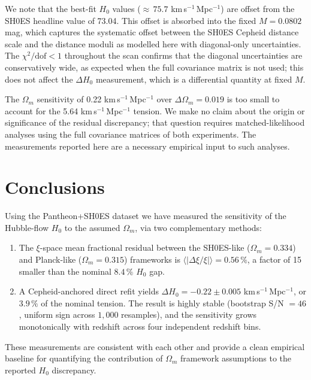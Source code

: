 \documentclass[usenatbib]{mnras}
\begin{document}
We note that the best-fit $H_0$ values (${\approx}\,75.7$ km\,s$^{-1}$\,Mpc$^{-1}$)
are offset from the SH0ES headline value of 73.04.
This offset is absorbed into the fixed $M = 0.0802$ mag,
which captures the systematic offset between the SH0ES Cepheid distance
scale and the distance moduli as modelled here with diagonal-only uncertainties.
The $\chi^2/\mathrm{dof} < 1$ throughout the scan confirms that
the diagonal uncertainties are conservatively wide, as expected when
the full covariance matrix is not used; this does not affect the
$\Delta H_0$ measurement, which is a differential quantity at fixed $M$.

The $\Omega_m$ sensitivity of 0.22 km\,s$^{-1}$\,Mpc$^{-1}$ over
$\Delta\Omega_m = 0.019$ is too small to account for the
5.64 km\,s$^{-1}$\,Mpc$^{-1}$ tension.
We make no claim about the origin or significance of the residual
discrepancy; that question requires matched-likelihood analyses using
the full covariance matrices of both experiments.
The measurements reported here are a necessary empirical input to
such analyses.

\section{Conclusions}
\label{sec:conc}

Using the Pantheon+SH0ES dataset we have measured the sensitivity of the
Hubble-flow $H_0$ to the assumed $\Omega_m$, via two complementary methods:

\begin{enumerate}
\item The $\xi$-space mean fractional residual between the SH0ES-like
  ($\Omega_m = 0.334$) and Planck-like ($\Omega_m = 0.315$) frameworks
  is $\langle|\Delta\xi/\xi|\rangle = 0.56\,\%$, a factor of 15
  smaller than the nominal $8.4\,\%$ $H_0$ gap.

\item A Cepheid-anchored direct refit yields
  $\Delta H_0 = -0.22 \pm 0.005$ km\,s$^{-1}$\,Mpc$^{-1}$,
  or $3.9\,\%$ of the nominal tension.
  The result is highly stable (bootstrap S/N $= 46$, uniform sign
  across $1{,}000$ resamples), and the sensitivity grows monotonically
  with redshift across four independent redshift bins.
\end{enumerate}

These measurements are consistent with each other and provide a
clean empirical baseline for quantifying the contribution of
$\Omega_m$ framework assumptions to the reported $H_0$ discrepancy.
\end{document}
